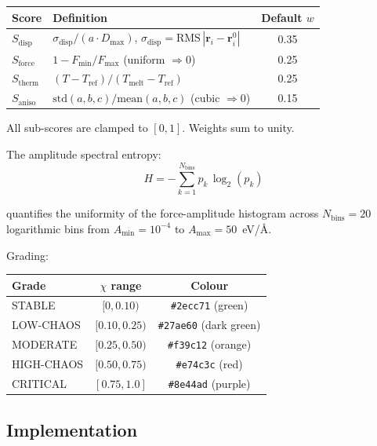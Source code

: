 \documentclass[11pt,a4paper]{article}
\begin{document}
\begin{center}
\small
\begin{tabular}{lp{6.5cm}c}
\toprule
\textbf{Score} & \textbf{Definition} & \textbf{Default $w$} \\
\midrule
$S_{\text{disp}}$ &
  $\sigma_{\text{disp}} / (a \cdot D_{\max})$, \;
  $\sigma_{\text{disp}} = \text{RMS}\,|\mathbf{r}_i - \mathbf{r}^{0}_i|$ &
  0.35 \\
$S_{\text{force}}$ &
  $1 - F_{\min}/F_{\max}$  (uniform $\Rightarrow 0$) &
  0.25 \\
$S_{\text{therm}}$ &
  $(T - T_{\text{ref}}) / (T_{\text{melt}} - T_{\text{ref}})$ &
  0.25 \\
$S_{\text{aniso}}$ &
  $\text{std}(a,b,c) / \text{mean}(a,b,c)$  (cubic $\Rightarrow 0$) &
  0.15 \\
\bottomrule
\end{tabular}
\end{center}

All sub-scores are clamped to $[0,1]$.  Weights sum to unity.

The amplitude spectral entropy:
\begin{equation}
  H = -\sum_{k=1}^{N_{\text{bins}}} p_{k}\,\log_{2}(p_{k})
  \label{eq:entropy}
\end{equation}

quantifies the uniformity of the force-amplitude histogram across
$N_{\text{bins}} = 20$ logarithmic bins from
$A_{\min} = 10^{-4}$ to $A_{\max} = 50$~eV/\AA.

Grading:
\begin{center}
\begin{tabular}{lcc}
\toprule
\textbf{Grade} & $\chi$ range & \textbf{Colour} \\
\midrule
STABLE     & $[0, 0.10)$   & \texttt{\#2ecc71} (green) \\
LOW-CHAOS  & $[0.10, 0.25)$ & \texttt{\#27ae60} (dark green) \\
MODERATE   & $[0.25, 0.50)$ & \texttt{\#f39c12} (orange) \\
HIGH-CHAOS & $[0.50, 0.75)$ & \texttt{\#e74c3c} (red) \\
CRITICAL   & $[0.75, 1.0]$  & \texttt{\#8e44ad} (purple) \\
\bottomrule
\end{tabular}
\end{center}

\subsection{Implementation}
\end{document}
